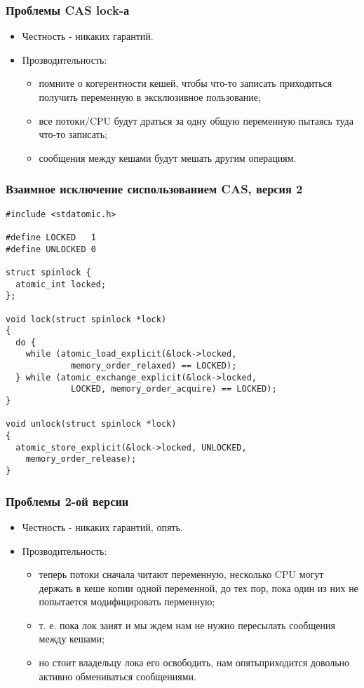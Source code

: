 \begin{frame}
\frametitle{Проблемы CAS lock-а}
\begin{itemize}
  \item Честность - никаких гарантий.
  \item Прозводительность:
  \begin{itemize}
    \item помните о когерентности кешей, чтобы что-то записать приходиться
    получить переменную в эксклюзивное пользование;
    \item все потоки/CPU будут драться за одну общую переменную пытаясь туда
    что-то записать;
    \item сообщения между кешами будут мешать другим операциям.
  \end{itemize}
\end{itemize}
\end{frame}

\begin{frame}[fragile]
\frametitle{Взаимное исключение сиспользованием CAS, версия 2}
\begin{lstlisting}
#include <stdatomic.h>

#define LOCKED   1
#define UNLOCKED 0

struct spinlock {
  atomic_int locked;
};

void lock(struct spinlock *lock)
{
  do {
    while (atomic_load_explicit(&lock->locked,
             memory_order_relaxed) == LOCKED);
  } while (atomic_exchange_explicit(&lock->locked,
             LOCKED, memory_order_acquire) == LOCKED);
}

void unlock(struct spinlock *lock)
{
  atomic_store_explicit(&lock->locked, UNLOCKED,
    memory_order_release);
}
\end{lstlisting}
\end{frame}

\begin{frame}
\frametitle{Проблемы 2-ой версии}
\begin{itemize}
  \item Честность - никаких гарантий, опять.
  \item Прозводительность:
  \begin{itemize}
    \item теперь потоки сначала читают переменную, несколько CPU могут держать
    в кеше копии одной переменной, до тех пор, пока один из них не попытается
    модифицировать перменную;
    \item т. е. пока лок занят и мы ждем нам не нужно пересылать сообщения между
    кешами;
    \item но стоит владельцу лока его освободить, нам опятьприходится довольно
    активно обмениваться сообщениями.
  \end{itemize}
\end{itemize}
\end{frame}

